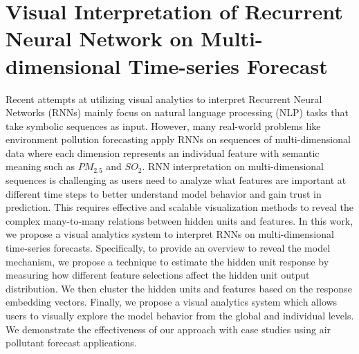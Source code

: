 \chapter{Visual Interpretation of Recurrent Neural Network on Multi-dimensional Time-series Forecast}\label{chap:c3_intro}
Recent attempts at utilizing visual analytics to interpret Recurrent Neural Networks (RNNs) mainly focus on natural language processing (NLP) tasks that take symbolic sequences as input.
However, many real-world problems like environment pollution forecasting apply RNNs on sequences of multi-dimensional data where each dimension represents an individual feature with semantic meaning such as $PM_{2.5}$ and $SO_2$.
RNN interpretation on multi-dimensional sequences is challenging as users need to analyze what features are important at different time steps to better understand model behavior and gain trust in prediction.
This requires effective and scalable visualization methods to reveal the complex many-to-many relations between hidden units and features.
In this work, we propose a visual analytics system to interpret RNNs on multi-dimensional time-series forecasts.  
Specifically, to provide an overview to reveal the model mechanism, we propose a technique to estimate the hidden unit response by measuring how different feature selections affect the hidden unit output distribution. 
We then cluster the hidden units and features based on the response embedding vectors. 
Finally, we propose a visual analytics system which allows users to visually explore the model behavior from the global and individual levels.
We demonstrate the effectiveness of our approach with case studies using air pollutant forecast applications.










